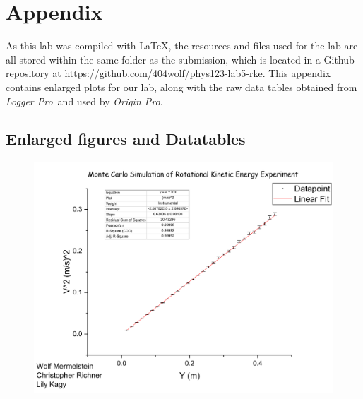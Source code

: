 \documentclass[coverpage]{article}
\newcommand{\softwareText}[1]{\textit{#1}\texttrademark}
\newcommand{\loggerpro}{\softwareText{Logger Pro}}
\newcommand{\origin}{\softwareText{Origin Pro}}
\begin{document}
	
	\nocite{textbook}
	\nocite{labManual}
	
	
	\onecolumn
	
	\section{Appendix} \label{sect:appendix}
		
	As this lab was compiled with \LaTeX, the resources and files used for the lab are all stored within the same folder as the submission, which is located in a Github repository at \url{https://github.com/404wolf/phys123-lab5-rke}. This appendix contains enlarged plots for our lab, along with the raw data tables obtained from \loggerpro~and used by \origin.
		
	\subsection{Enlarged figures and Datatables}
	
	\begin{figure}[h]
		\centering
		\includegraphics[width=6in]{plots/monteCarloPlot.pdf}
	\end{figure}
		
\end{document}
